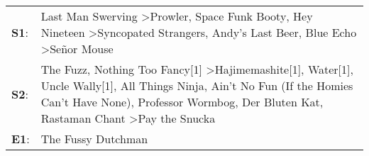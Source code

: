 \begin{supertabular}{p{0.03\textwidth}p{0.92\textwidth}}
 \textbf{S1}:  &                                                                                                                                                          Last Man Swerving\textsuperscript{} \textgreater \enspace Prowler\textsuperscript{}, \enspace Space Funk Booty\textsuperscript{}, \enspace Hey Nineteen\textsuperscript{} \textgreater \enspace Syncopated Strangers\textsuperscript{}, \enspace Andy's Last Beer\textsuperscript{}, \enspace Blue Echo\textsuperscript{} \textgreater \enspace Señor Mouse\textsuperscript{}  \enspace  \\
 \textbf{S2}:  &  The Fuzz\textsuperscript{}, \enspace Nothing Too Fancy[1]\textsuperscript{} \textgreater \enspace Hajimemashite[1]\textsuperscript{}, \enspace Water[1]\textsuperscript{}, \enspace Uncle Wally[1]\textsuperscript{}, \enspace All Things Ninja\textsuperscript{}, \enspace Ain't No Fun (If the Homies Can't Have None)\textsuperscript{}, \enspace Professor Wormbog\textsuperscript{}, \enspace Der Bluten Kat\textsuperscript{}, \enspace Rastaman Chant\textsuperscript{} \textgreater \enspace Pay the Snucka\textsuperscript{}  \enspace  \\
 \textbf{E1}:  &                                                                                                                                                                                                                                                                                                                                                                                                                                                                                                   The Fussy Dutchman\textsuperscript{}  \enspace  \\
\end{supertabular}
